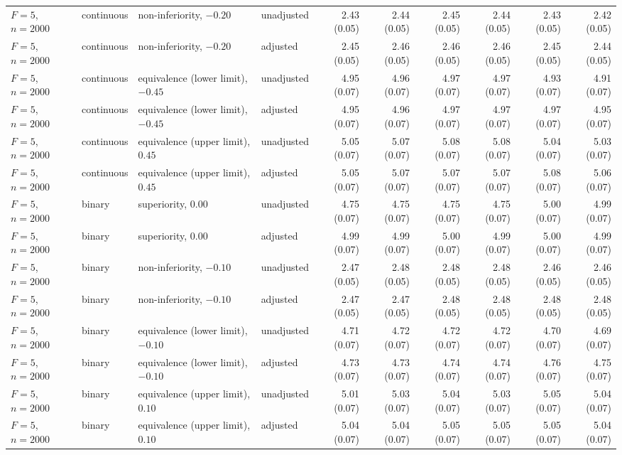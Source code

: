 \documentclass[12pt,a4paper]{article}
\theoremstyle{definition}
\theoremstyle{remark}\newtheorem{remark}{Remark}
\numberwithin{equation}{section}
\begin{document}
\begin{landscape}
\begin{singlespace}
\begin{longtable}{@{}llllrrrrrr@{}}
$F=5$, $n=2000$ & continuous & non-inferiority, $-0.20$ & unadjusted & 2.43 (0.05) & 2.44 (0.05) & 2.45 (0.05) & 2.44 (0.05) & 2.43 (0.05) & 2.42 (0.05)\\
$F=5$, $n=2000$ & continuous & non-inferiority, $-0.20$ & adjusted & 2.45 (0.05) & 2.46 (0.05) & 2.46 (0.05) & 2.46 (0.05) & 2.45 (0.05) & 2.44 (0.05)\\
$F=5$, $n=2000$ & continuous & equivalence (lower limit), $-0.45$ & unadjusted & 4.95 (0.07) & 4.96 (0.07) & 4.97 (0.07) & 4.97 (0.07) & 4.93 (0.07) & 4.91 (0.07)\\
$F=5$, $n=2000$ & continuous & equivalence (lower limit), $-0.45$ & adjusted & 4.95 (0.07) & 4.96 (0.07) & 4.97 (0.07) & 4.97 (0.07) & 4.97 (0.07) & 4.95 (0.07)\\
$F=5$, $n=2000$ & continuous & equivalence (upper limit), $0.45$ & unadjusted & 5.05 (0.07) & 5.07 (0.07) & 5.08 (0.07) & 5.08 (0.07) & 5.04 (0.07) & 5.03 (0.07)\\
$F=5$, $n=2000$ & continuous & equivalence (upper limit), $0.45$ & adjusted & 5.05 (0.07) & 5.07 (0.07) & 5.07 (0.07) & 5.07 (0.07) & 5.08 (0.07) & 5.06 (0.07)\\
$F=5$, $n=2000$ & binary & superiority, $0.00$ & unadjusted & 4.75 (0.07) & 4.75 (0.07) & 4.75 (0.07) & 4.75 (0.07) & 5.00 (0.07) & 4.99 (0.07)\\
$F=5$, $n=2000$ & binary & superiority, $0.00$ & adjusted & 4.99 (0.07) & 4.99 (0.07) & 5.00 (0.07) & 4.99 (0.07) & 5.00 (0.07) & 4.99 (0.07)\\
$F=5$, $n=2000$ & binary & non-inferiority, $-0.10$ & unadjusted & 2.47 (0.05) & 2.48 (0.05) & 2.48 (0.05) & 2.48 (0.05) & 2.46 (0.05) & 2.46 (0.05)\\
$F=5$, $n=2000$ & binary & non-inferiority, $-0.10$ & adjusted & 2.47 (0.05) & 2.47 (0.05) & 2.48 (0.05) & 2.48 (0.05) & 2.48 (0.05) & 2.48 (0.05)\\
$F=5$, $n=2000$ & binary & equivalence (lower limit), $-0.10$ & unadjusted & 4.71 (0.07) & 4.72 (0.07) & 4.72 (0.07) & 4.72 (0.07) & 4.70 (0.07) & 4.69 (0.07)\\
$F=5$, $n=2000$ & binary & equivalence (lower limit), $-0.10$ & adjusted & 4.73 (0.07) & 4.73 (0.07) & 4.74 (0.07) & 4.74 (0.07) & 4.76 (0.07) & 4.75 (0.07)\\
$F=5$, $n=2000$ & binary & equivalence (upper limit), $0.10$ & unadjusted & 5.01 (0.07) & 5.03 (0.07) & 5.04 (0.07) & 5.03 (0.07) & 5.05 (0.07) & 5.04 (0.07)\\
$F=5$, $n=2000$ & binary & equivalence (upper limit), $0.10$ & adjusted & 5.04 (0.07) & 5.04 (0.07) & 5.05 (0.07) & 5.05 (0.07) & 5.05 (0.07) & 5.04 (0.07)\\
\end{longtable}
\endgroup\end{singlespace}\end{landscape}
\end{document}
